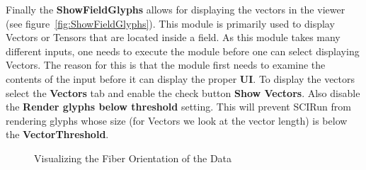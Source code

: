 \documentclass[fleqn,11pt,openany]{book}
\begin{document}
Finally the {\bf ShowFieldGlyphs} allows for displaying the vectors in the viewer (see figure~\ref{fig:ShowFieldGlyphs}). This module is primarily used to display Vectors or Tensors that are located inside a field. As this module takes many different inputs, one needs to execute the module before one can select displaying Vectors. The reason for this is that the module first needs to examine the contents of the input before it can display the proper {\bf UI}. To display the vectors select the {\bf Vectors} tab and enable the check button {\bf Show Vectors}. Also disable the {\bf Render glyphs below threshold} setting. This will prevent SCIRun from rendering glyphs whose size (for Vectors we look at the vector length) is below the {\bf VectorThreshold}.

\begin{figure}
\caption{Visualizing the Fiber Orientation of the Data}\label{fig:Vectors}
\end{figure}
\end{document}
